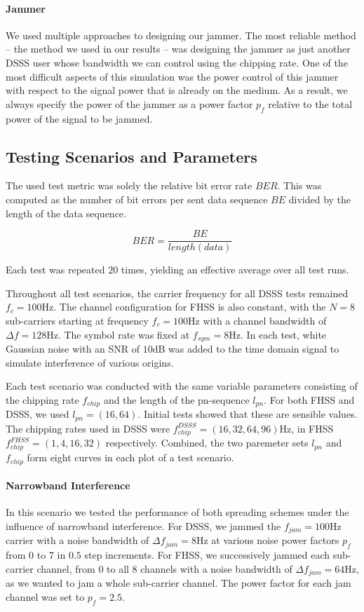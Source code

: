 	\paragraph{Jammer}
	We used multiple approaches to designing our jammer. The most reliable method -- the method we used in our results -- was designing the jammer as just another DSSS user whose bandwidth we can control using the chipping rate. One of the most difficult aspects of this simulation was the power control of this jammer with respect to the signal power that is already on the medium. As a result, we always specify the power of the jammer as a power factor $p_f$ relative to the total power of the signal to be jammed.
	
	\subsection{Testing Scenarios and Parameters}
	The used test metric was solely the relative bit error rate $BER$. This was computed as the number of bit errors per sent data sequence $BE$ divided by the length of the data sequence.
	
	\[
		BER = \frac{BE}{length(data)}
	\]
	
	Each test was repeated $20$ times, yielding an effective average over all test runs.
	
	Throughout all test scenarios, the carrier frequency for all DSSS tests remained $f_c = 100\text{Hz}$. The channel configuration for FHSS is also constant, with the $N=8$ sub-carriers starting at frequency $f_c = 100\text{Hz}$ with a channel bandwidth of $\Delta f = 128 \text{Hz}$. The symbol rate was fixed at $f_{sym} = 8\text{Hz}$. In each test, white Gaussian noise with an SNR of $10\text{dB}$ was added to the time domain signal to simulate interference of various origins.
	
	Each test scenario was conducted with the same variable parameters consisting of the chipping rate $f_{chip}$ and the length of the pn-sequence $l_{pn}$. For both FHSS and DSSS, we used $l_{pn} = (16, 64)$. Initial tests showed that these are sensible values. The chipping rates used in DSSS were $f_{chip}^{DSSS} = (16,32,64,96)\text{Hz}$, in FHSS $f_{chip}^{FHSS} = (1, 4, 16, 32)$ respectively. Combined, the two paremeter sets $l_{pn}$ and $f_{chip}$ form eight curves in each plot of a test scenario.
	
	\paragraph{Narrowband Interference}
	In this scenario we tested the performance of both spreading schemes under the influence of narrowband interference. For DSSS, we jammed the $f_{jam} = 100\text{Hz}$ carrier with a noise bandwidth of $\Delta f_{jam} = 8\text{Hz}$ at various noise power factors $p_f$ from $0$ to $7$ in $0.5$ step increments. For FHSS, we successively jammed each sub-carrier channel, from $0$ to all $8$ channels with a noise bandwidth of $\Delta f_{jam} = 64\text{Hz}$, as we wanted to jam a whole sub-carrier channel. The power factor for each jam channel was set to $p_f = 2.5$.
	
